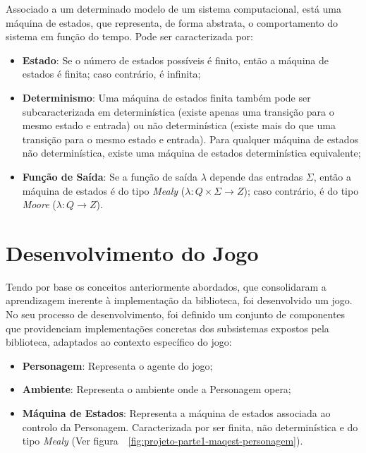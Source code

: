 Associado a um determinado modelo de um sistema computacional, está uma máquina de estados, que representa, de forma abstrata, o comportamento do sistema em função do tempo. Pode ser caracterizada por:

\begin{itemize}
    \item \textbf{Estado}: Se o número de estados possíveis é finito, então a máquina de estados é finita; caso contrário, é infinita;
    \item \textbf{Determinismo}: Uma máquina de estados finita também pode ser subcaracterizada em determinística (existe apenas uma transição para o mesmo estado e entrada) ou não determinística (existe mais do que uma transição para o mesmo estado e entrada).
    Para qualquer máquina de estados não determinística, existe uma máquina de estados determinística equivalente; \cite{wiki:finite-state-machine,freecodecamp:state-machines}
    \item \textbf{Função de Saída}: Se a função de saída $\lambda$ depende das entradas $\Sigma$, então a máquina de estados é do tipo \textit{Mealy} ($\lambda : Q \times \Sigma \rightarrow Z$); caso contrário, é do tipo \textit{Moore} ($\lambda : Q \rightarrow Z$).
\end{itemize}


\section{Desenvolvimento do Jogo}\label{sec:desenvolvimento-do-jogo}

Tendo por base os conceitos anteriormente abordados, que consolidaram a aprendizagem inerente à implementação da biblioteca, foi desenvolvido um jogo. No seu processo de desenvolvimento, foi definido um conjunto de componentes que providenciam implementações concretas dos subsistemas expostos pela biblioteca, adaptados ao contexto específico do jogo:

\begin{itemize}
    \item \textbf{Personagem}: Representa o agente do jogo;
    \item \textbf{Ambiente}: Representa o ambiente onde a Personagem opera;
    \item \textbf{Máquina de Estados}: Representa a máquina de estados associada ao controlo da Personagem.
    Caracterizada por ser finita, não determinística e do tipo \textit{Mealy} (Ver figura~~\ref{fig:projeto-parte1-maqest-personagem}).
\end{itemize}

